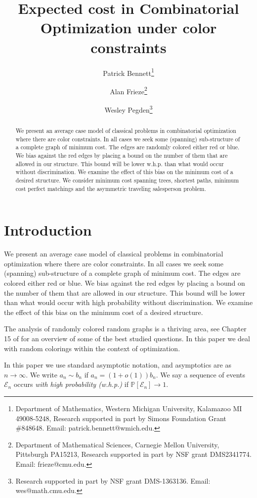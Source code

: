 \documentclass[12pt]{article}
\newcommand{\1}{\textbf{1}}
\def\cE{{\cal E}}
\def\Pr{\mathbb{P}}
\def\cE{{\mathcal E}}
\begin{document}
\author{Patrick Bennett\thanks{Department of Mathematics, Western Michigan University, Kalamazoo MI 49008-5248, Research supported in part by Simons Foundation Grant \#848648. Email: patrick.bennett@wmich.edu.}\and Alan Frieze\thanks{Department of Mathematical Sciences, Carnegie Mellon University, Pittsburgh PA15213, Research supported in part by NSF grant DMS2341774. Email: frieze@cmu.edu.}\and Wesley Pegden\thanks{Research supported in part by NSF grant DMS-1363136. Email: wes@math.cmu.edu.}}
\title{Expected cost in Combinatorial Optimization under color constraints}
\maketitle
\begin{abstract}
We present an average case model of classical problems in combinatorial optimization where there are color constraints. In all cases we seek some (spanning) sub-structure of a complete graph of minimum cost. The edges are randomly colored either red or blue. We bias against the red edges by placing a bound on the number of them that are allowed in our structure. This bound will be lower w.h.p. than what would occur without discrimination. We examine the effect of this bias on the minimum cost of a desired structure. We consider minimum cost spanning trees, shortest paths, minimum cost perfect matchings and the asymmetric traveling salesperson problem.
\end{abstract}
\section{Introduction}
We present an average case model of classical problems in combinatorial optimization where there are color constraints. In all cases we seek some (spanning) sub-structure of a complete graph of minimum cost. The edges are colored either red or blue. We bias against the red edges by placing a bound on the number of them that are allowed in our structure. This bound will be lower than what would occur with high probability without discrimination. We examine the effect of this bias on the minimum cost of a desired structure.

The analysis of randomly colored random graphs is a thriving area, see Chapter 15 of \cite{FK} for an overview of some of the best studied questions. In this paper we deal with random colorings within the context of optimization.

In this paper we use standard asymptotic notation, and asymptotics are as $n \rightarrow \infty$. We write $a_n \sim b_n$ if $a_n = (1+o(1))b_n$. We say a sequence of events $\cE_n$ occurs {\em with high probability (w.h.p.)} if $\Pr[\cE_n] \rightarrow 1$. 
\end{document}
